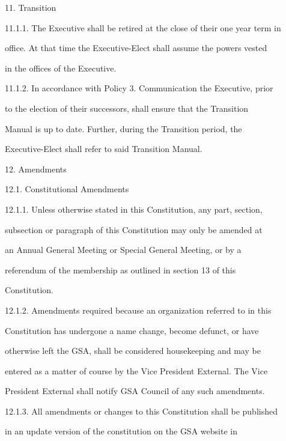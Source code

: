 11.  Transition  



11.1.1.     The Executive shall be retired at the close of their one year term in  

        office. At that time the Executive-Elect shall assume the powers vested  

        in the offices of the Executive.  



11.1.2.     In accordance  with Policy  3. Communication the  Executive, prior  

        to  the  election  of  their  successors,  shall  ensure  that  the  Transition  

        Manual  is  up  to  date.  Further,  during  the  Transition  period,  the  

        Executive-Elect shall refer to said Transition Manual.  



12.  Amendments  



12.1.       Constitutional Amendments  



12.1.1.     Unless  otherwise  stated  in  this  Constitution,  any  part,  section,  

        subsection or paragraph of this Constitution may only be amended at  

        an  Annual  General  Meeting  or  Special  General  Meeting,  or  by  a  

        referendum  of  the  membership  as  outlined  in  section  13  of  this  

        Constitution.  



12.1.2.     Amendments  required  because  an  organization  referred  to  in  this  

        Constitution has undergone a name change, become defunct, or have  

        otherwise left the GSA, shall be considered housekeeping and may be  

        entered as a matter of course by the Vice President External. The Vice  

        President External shall notify GSA Council of any such amendments.  



12.1.3.     All amendments or changes to this Constitution shall be published  

        in  an  update  version  of  the  constitution  on  the  GSA  website  in  

